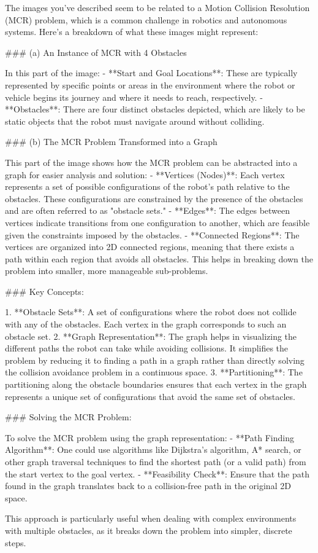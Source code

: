 The images you've described seem to be related to a Motion Collision Resolution (MCR) problem, which is a common challenge in robotics and autonomous systems. Here's a breakdown of what these images might represent:

### (a) An Instance of MCR with 4 Obstacles

In this part of the image:
- **Start and Goal Locations**: These are typically represented by specific points or areas in the environment where the robot or vehicle begins its journey and where it needs to reach, respectively.
- **Obstacles**: There are four distinct obstacles depicted, which are likely to be static objects that the robot must navigate around without colliding.

### (b) The MCR Problem Transformed into a Graph

This part of the image shows how the MCR problem can be abstracted into a graph for easier analysis and solution:
- **Vertices (Nodes)**: Each vertex represents a set of possible configurations of the robot's path relative to the obstacles. These configurations are constrained by the presence of the obstacles and are often referred to as "obstacle sets."
- **Edges**: The edges between vertices indicate transitions from one configuration to another, which are feasible given the constraints imposed by the obstacles.
- **Connected Regions**: The vertices are organized into 2D connected regions, meaning that there exists a path within each region that avoids all obstacles. This helps in breaking down the problem into smaller, more manageable sub-problems.

### Key Concepts:

1. **Obstacle Sets**: A set of configurations where the robot does not collide with any of the obstacles. Each vertex in the graph corresponds to such an obstacle set.
2. **Graph Representation**: The graph helps in visualizing the different paths the robot can take while avoiding collisions. It simplifies the problem by reducing it to finding a path in a graph rather than directly solving the collision avoidance problem in a continuous space.
3. **Partitioning**: The partitioning along the obstacle boundaries ensures that each vertex in the graph represents a unique set of configurations that avoid the same set of obstacles.

### Solving the MCR Problem:

To solve the MCR problem using the graph representation:
- **Path Finding Algorithm**: One could use algorithms like Dijkstra’s algorithm, A* search, or other graph traversal techniques to find the shortest path (or a valid path) from the start vertex to the goal vertex.
- **Feasibility Check**: Ensure that the path found in the graph translates back to a collision-free path in the original 2D space.

This approach is particularly useful when dealing with complex environments with multiple obstacles, as it breaks down the problem into simpler, discrete steps.